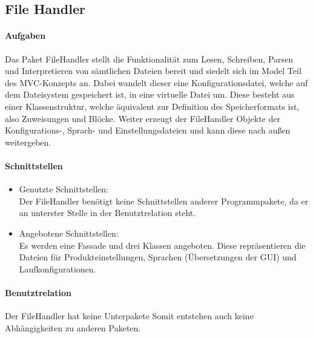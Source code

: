\documentclass[parskip=full]{scrartcl}
\begin{document}
\subsection{File Handler}
\paragraph{Aufgaben}
Das Paket FileHandler stellt die Funktionalität zum Lesen, Schreiben, Parsen und Interpretieren von sämtlichen Dateien bereit und siedelt sich im Model Teil des MVC-Konzepts an.
Dabei wandelt dieser eine Konfigurationsdatei, welche auf dem Dateisystem gespeichert ist, in eine virtuelle Datei um.
Diese besteht aus einer Klassenstruktur, welche äquivalent zur Definition des Speicherformats ist, also Zuweisungen und Blöcke.
Weiter erzeugt der FileHandler Objekte der Konfigurations-, Sprach- und Einstellungsdateien und kann diese nach außen weitergeben.
\paragraph{Schnittstellen}
\begin{itemize}
\item Genutzte Schnittstellen: \\
Der FileHandler benötigt keine Schnittstellen anderer Programmpakete, da er an unterster Stelle in der Benutztrelation steht.
\item Angebotene Schnittstellen: \\
Es werden eine Fassade und drei Klassen angeboten.
Diese repräsentieren die Dateien für Produkteinstellungen, Sprachen (Übersetzungen der GUI) und Laufkonfigurationen.

\end{itemize}
\paragraph{Benutztrelation}
Der FileHandler hat keine Unterpakete
Somit entstehen auch keine Abhängigkeiten zu anderen Paketen.
\end{document}
